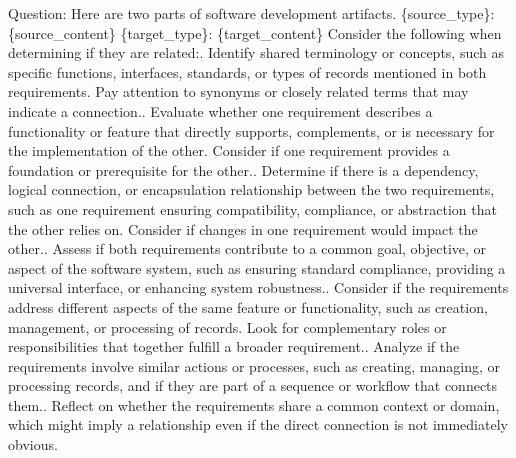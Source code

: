Question: Here are two parts of software development artifacts.\newline
\newline
\{source\_type\}: \textquotesingle{}\textquotesingle{}\textquotesingle{}\{source\_content\}\textquotesingle{}\textquotesingle{}\textquotesingle{}\newline
\newline
\{target\_type\}: \textquotesingle{}\textquotesingle{}\textquotesingle{}\{target\_content\}\textquotesingle{}\textquotesingle{}\textquotesingle{}\newline
\newline
Consider the following when determining if they are related:. Identify shared terminology or concepts, such as specific functions, interfaces, standards, or types of records mentioned in both requirements. Pay attention to synonyms or closely related terms that may indicate a connection.. Evaluate whether one requirement describes a functionality or feature that directly supports, complements, or is necessary for the implementation of the other. Consider if one requirement provides a foundation or prerequisite for the other.. Determine if there is a dependency, logical connection, or encapsulation relationship between the two requirements, such as one requirement ensuring compatibility, compliance, or abstraction that the other relies on. Consider if changes in one requirement would impact the other.. Assess if both requirements contribute to a common goal, objective, or aspect of the software system, such as ensuring standard compliance, providing a universal interface, or enhancing system robustness.. Consider if the requirements address different aspects of the same feature or functionality, such as creation, management, or processing of records. Look for complementary roles or responsibilities that together fulfill a broader requirement.. Analyze if the requirements involve similar actions or processes, such as creating, managing, or processing records, and if they are part of a sequence or workflow that connects them.. Reflect on whether the requirements share a common context or domain, which might imply a relationship even if the direct connection is not immediately obvious.\newline
